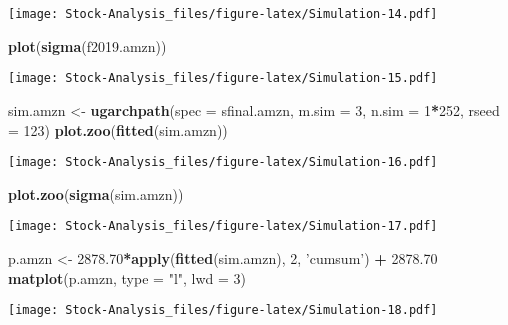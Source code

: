 \documentclass[
]{article}
\newenvironment{Shaded}{\begin{snugshade}}{\end{snugshade}}
\newcommand{\DataTypeTok}[1]{\textcolor[rgb]{0.13,0.29,0.53}{#1}}
\newcommand{\DecValTok}[1]{\textcolor[rgb]{0.00,0.00,0.81}{#1}}
\newcommand{\FloatTok}[1]{\textcolor[rgb]{0.00,0.00,0.81}{#1}}
\newcommand{\KeywordTok}[1]{\textcolor[rgb]{0.13,0.29,0.53}{\textbf{#1}}}
\newcommand{\NormalTok}[1]{#1}
\newcommand{\OperatorTok}[1]{\textcolor[rgb]{0.81,0.36,0.00}{\textbf{#1}}}
\newcommand{\StringTok}[1]{\textcolor[rgb]{0.31,0.60,0.02}{#1}}
\begin{document}
\texttt{[image: Stock-Analysis\_files/figure-latex/Simulation-14.pdf]}

\begin{Shaded}
\begin{Highlighting}[]
\KeywordTok{plot}\NormalTok{(}\KeywordTok{sigma}\NormalTok{(f2019.amzn))}
\end{Highlighting}
\end{Shaded}

\texttt{[image: Stock-Analysis\_files/figure-latex/Simulation-15.pdf]}

\begin{Shaded}
\begin{Highlighting}[]
\NormalTok{sim.amzn <-}\StringTok{ }\KeywordTok{ugarchpath}\NormalTok{(}\DataTypeTok{spec =}\NormalTok{ sfinal.amzn,}
                  \DataTypeTok{m.sim =} \DecValTok{3}\NormalTok{,}
                  \DataTypeTok{n.sim =} \DecValTok{1}\OperatorTok{*}\DecValTok{252}\NormalTok{,}
                  \DataTypeTok{rseed =} \DecValTok{123}\NormalTok{)}
\KeywordTok{plot.zoo}\NormalTok{(}\KeywordTok{fitted}\NormalTok{(sim.amzn))}
\end{Highlighting}
\end{Shaded}

\texttt{[image: Stock-Analysis\_files/figure-latex/Simulation-16.pdf]}

\begin{Shaded}
\begin{Highlighting}[]
\KeywordTok{plot.zoo}\NormalTok{(}\KeywordTok{sigma}\NormalTok{(sim.amzn))}
\end{Highlighting}
\end{Shaded}

\texttt{[image: Stock-Analysis\_files/figure-latex/Simulation-17.pdf]}

\begin{Shaded}
\begin{Highlighting}[]
\NormalTok{p.amzn <-}\StringTok{ }\FloatTok{2878.70}\OperatorTok{*}\KeywordTok{apply}\NormalTok{(}\KeywordTok{fitted}\NormalTok{(sim.amzn), }\DecValTok{2}\NormalTok{, }\StringTok{'cumsum'}\NormalTok{) }\OperatorTok{+}\StringTok{ }\FloatTok{2878.70}
\KeywordTok{matplot}\NormalTok{(p.amzn, }\DataTypeTok{type =} \StringTok{"l"}\NormalTok{, }\DataTypeTok{lwd =} \DecValTok{3}\NormalTok{)}
\end{Highlighting}
\end{Shaded}

\texttt{[image: Stock-Analysis\_files/figure-latex/Simulation-18.pdf]}
\end{document}
